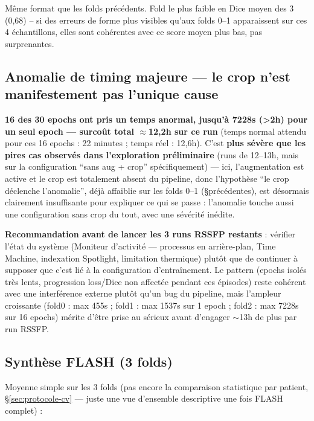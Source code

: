 \documentclass[11pt,a4paper]{report}
\begin{document}
Même format que les folds précédents. Fold le plus faible en Dice moyen des 3
(0,68) -- si des erreurs de forme plus visibles qu'aux folds 0--1 apparaissent sur
ces 4 échantillons, elles sont cohérentes avec ce score moyen plus bas, pas
surprenantes.

\subsection{Anomalie de timing majeure --- le crop n'est manifestement pas
l'unique cause}

\textbf{16 des 30 epochs ont pris un temps anormal, jusqu'à 7228s (>2h) pour un seul
epoch --- surcoût total $\approx$12,2h sur ce run} (temps normal attendu pour ces 16
epochs : 22 minutes ; temps réel : 12,6h). C'est \textbf{plus sévère que les pires cas
observés dans l'exploration préliminaire} (runs de 12--13h, mais sur la configuration
``sans aug + crop'' spécifiquement) --- ici, l'augmentation est active et le crop est
totalement absent du pipeline, donc l'hypothèse ``le crop déclenche l'anomalie'',
déjà affaiblie sur les folds 0--1 (\S précédentes), est désormais clairement
insuffisante pour expliquer ce qui se passe : l'anomalie touche aussi une
configuration sans crop du tout, avec une sévérité inédite.

\textbf{Recommandation avant de lancer les 3 runs RSSFP restants} : vérifier l'état
du système (Moniteur d'activité --- processus en arrière-plan, Time Machine, indexation
Spotlight, limitation thermique) plutôt que de continuer à supposer que c'est lié à la
configuration d'entraînement. Le pattern (epochs isolés très lents, progression
loss/Dice non affectée pendant ces épisodes) reste cohérent avec une interférence
externe plutôt qu'un bug du pipeline, mais l'ampleur croissante (fold0 : max
455s ; fold1 : max 1537s sur 1 epoch ; fold2 : max 7228s sur 16 epochs) mérite
d'être prise au sérieux avant d'engager $\sim$13h de plus par run RSSFP.

\subsection{Synthèse FLASH (3 folds)}

Moyenne simple sur les 3 folds (pas encore la comparaison statistique par patient,
\S\ref{sec:protocole-cv} --- juste une vue d'ensemble descriptive une fois FLASH
complet) :
\end{document}
